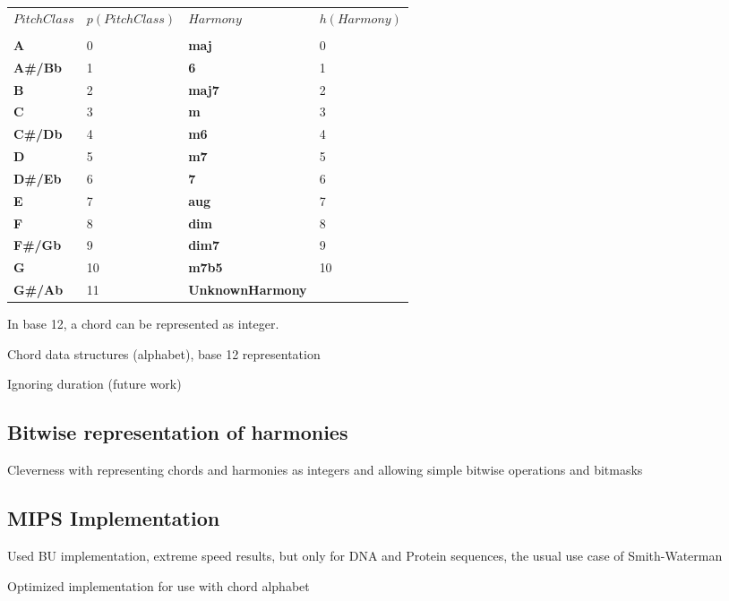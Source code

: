 \begin{tabular}{llll}
\toprule
$PitchClass$ & $p(PitchClass)$ & $Harmony$ & $h(Harmony)$ \\
\cmidrule(r){1-2} \cmidrule(r){3-4} \\
\textbf{A}     & 0  & \textbf{maj} & 0 \\
\textbf{A#/Bb} & 1  & \textbf{6} & 1 \\
\textbf{B}     & 2  & \textbf{maj7} & 2 \\
\textbf{C}     & 3  & \textbf{m} & 3 \\
\textbf{C#/Db} & 4  & \textbf{m6} & 4 \\
\textbf{D}     & 5  & \textbf{m7} & 5 \\
\textbf{D#/Eb} & 6  & \textbf{7} & 6 \\
\textbf{E}     & 7  & \textbf{aug} & 7 \\
\textbf{F}     & 8  & \textbf{dim} & 8 \\
\textbf{F#/Gb} & 9  & \textbf{dim7} & 9 \\
\textbf{G}     & 10 & \textbf{m7b5} & 10 \\
\textbf{G#/Ab} & 11 & \textbf{UnknownHarmony} & \\
\end{tabular}

In base 12, a chord can be represented as integer.

\item Chord data structures (alphabet), base 12 representation

\item Ignoring duration (future work)

\subsection{Bitwise representation of harmonies}

\item Cleverness with representing chords and harmonies as integers and allowing simple bitwise operations and bitmasks

\subsection{MIPS Implementation}

\item Used BU implementation, extreme speed results, but only for DNA and Protein sequences, the usual use case of Smith-Waterman

\item Optimized implementation for use with chord alphabet

